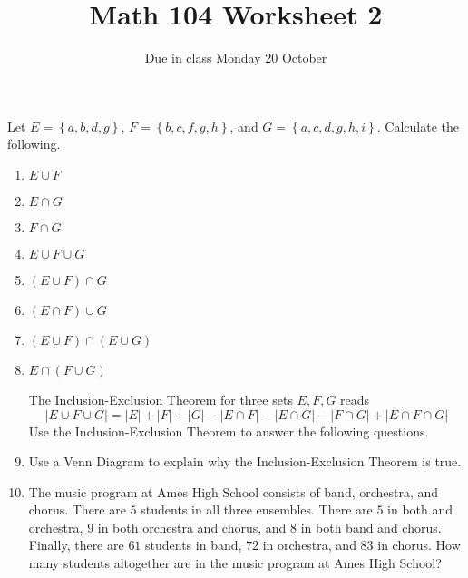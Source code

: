 \documentclass[11pt]{article}
\author{}\date{Due in class Monday 20 October}
\title{Math 104 Worksheet 2}\author{}
\begin{document}
\maketitle
\pagestyle{empty}
Let $E=\left\{a,b,d,g\right\}$,
$F=\left\{b,c,f,g,h\right\}$, and
$G=\left\{a,c,d,g,h,i\right\}$.
Calculate the following.
\begin{enumerate}
\item $E\cup F$\vspace{.25in}
\item $E\cap G$\vspace{.25in}
\item $F\cap G$\vspace{.25in}
\item $E\cup F\cup G$\vspace{.25in}
\item $\left(E\cup F\right)\cap G$\vspace{.25in}
\item $\left(E\cap F\right)\cup G$\vspace{.25in}
\item $\left(E\cup F\right)\cap\left(E\cup G\right)$\vspace{.25in}
\item $E\cap\left(F\cup G\right)$\vspace{.25in}

The Inclusion-Exclusion Theorem for three sets $E,F,G$ reads
\[\left|E\cup F\cup G\right|
=\left|E\right|+\left|F\right|+\left|G\right|
-\left|E\cap F\right|
-\left|E\cap G\right|
-\left|F\cap G\right|
+\left|E\cap F\cap G\right|\]
Use the Inclusion-Exclusion Theorem to answer the following questions.
\item Use a Venn Diagram to explain why
the Inclusion-Exclusion Theorem is true.
\item The music program at Ames High School
consists of band, orchestra, and chorus. There are
$5$ students in all three ensembles.
There are $5$ in both and orchestra, $9$
in both orchestra and chorus, and $8$ in both band
and chorus. Finally, there are $61$ students in band,
$72$ in orchestra, and $83$ in chorus. How many students
altogether are in the music program at Ames High School?
\end{enumerate}
\end{document}
